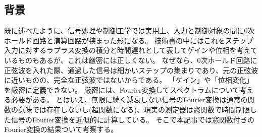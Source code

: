        \subsection{背景}
            既に述べたように、信号処理や制御工学では実用上、入力と制御対象の間に0次ホールド回路と演算回路が挟まった形になる。
            技術書の中にはこれをステップ入力に対するラプラス変換の積分と時間遅れとして表してゲインや位相を考えているものもあるが、これは厳密には正しくない。
            なぜなら、0次ホールド回路に正弦波を入れた際、通過した信号は細かいステップの集まりであり、元の正弦波に近いものの、完全な正弦波ではないからである。
            「ゲイン」や「位相変化」を厳密に定義できない。
            厳密には、Fourier変換してスペクトラムについて考える必要がある。
            とはいえ、無限に続く減衰しない信号のFourier変換は通常の関数の意味では存在しないし(超関数になる)、現実の測定器は窓関数で時間制限した信号のFourier変換を近似的に計算している。
            そこで本記事では窓関数付きのFourier変換の結果ついて考察する。
